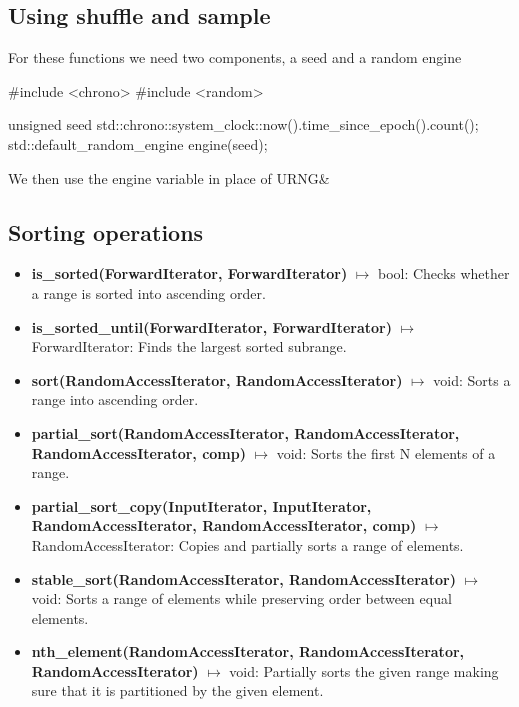 \documentclass{report}
\begin{document}
    \bigbreak \noindent 
    \subsection{Using shuffle and sample}
    \bigbreak \noindent 
    For these functions we need two components, a seed and a random engine
    \bigbreak \noindent 
    \begin{cppcode}
#include <chrono>
#include <random>

unsigned seed std::chrono::system_clock::now().time_since_epoch().count();
std::default_random_engine engine(seed);
    \end{cppcode}
    \bigbreak \noindent 
    We then use the engine variable in place of URNG\&

    \bigbreak \noindent 
    \subsection{Sorting operations}
    \begin{itemize}
        \item \textbf{is\_sorted(ForwardIterator, ForwardIterator)} \(\mapsto\) bool: Checks whether a range is sorted into ascending order.
        \item \textbf{is\_sorted\_until(ForwardIterator, ForwardIterator)} \(\mapsto\) ForwardIterator: Finds the largest sorted subrange.
        \item \textbf{sort(RandomAccessIterator, RandomAccessIterator)} \(\mapsto\) void: Sorts a range into ascending order.
        \item \textbf{partial\_sort(RandomAccessIterator, RandomAccessIterator, RandomAccessIterator, comp)} \(\mapsto\) void: Sorts the first N elements of a range.
        \item \textbf{partial\_sort\_copy(InputIterator, InputIterator, RandomAccessIterator, RandomAccessIterator, comp)} \(\mapsto\) RandomAccessIterator: Copies and partially sorts a range of elements.
        \item \textbf{stable\_sort(RandomAccessIterator, RandomAccessIterator)} \(\mapsto\) void: Sorts a range of elements while preserving order between equal elements.
        \item \textbf{nth\_element(RandomAccessIterator, RandomAccessIterator, RandomAccessIterator)} \(\mapsto\) void: Partially sorts the given range making sure that it is partitioned by the given element.
    \end{itemize}
\end{document}
